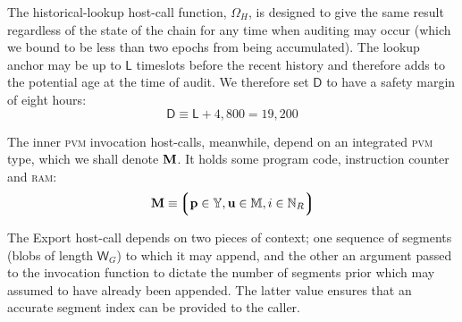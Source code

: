 The historical-lookup host-call function, $\Omega_H$, is designed to give the same result regardless of the state of the chain for any time when auditing may occur (which we bound to be less than two epochs from being accumulated). The lookup anchor may be up to $\mathsf{L}$ timeslots before the recent history and therefore adds to the potential age at the time of audit. We therefore set $\mathsf{D}$ to have a safety margin of eight hours:
\begin{equation}
  \mathsf{D} \equiv \mathsf{L} + 4,800 = 19,200
\end{equation}


The inner \textsc{pvm} invocation host-calls, meanwhile, depend on an integrated \textsc{pvm} type, which we shall denote $\mathbf{M}$. It holds some program code, instruction counter and \textsc{ram}:
\begin{equation}
  \pvm \equiv \tuple{\isa{\mathbf{p}}{\Y}, \isa{\mathbf{u}}{\ram}, \isa{i}{\N_R}}
\end{equation}

The Export host-call depends on two pieces of context; one sequence of segments (blobs of length $\mathsf{W}_G$) to which it may append, and the other an argument passed to the invocation function to dictate the number of segments prior which may assumed to have already been appended. The latter value ensures that an accurate segment index can be provided to the caller.

